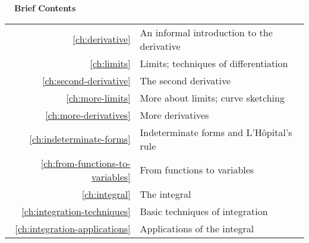 \documentclass{fund}
\begin{document}


\cleardoublepage





\pagebreak\vspace{100mm}

\hbox{}\noindent\huge\bfseries\sffamily{}\hspace{-2mm}\ \ Brief Contents\\
\hspace{-20mm}\noindent\mynormaltype\Large\sffamily{}\begin{tabular}{rl}
\ref{ch:derivative} & An informal introduction to the derivative \quad \pageref{ch:derivative}\\
\ref{ch:limits} &  Limits; techniques of differentiation \quad \pageref{ch:limits}\\
\ref{ch:second-derivative} & The second derivative \quad \pageref{ch:second-derivative}\\
\ref{ch:more-limits} & More about limits; curve sketching\quad \pageref{ch:more-limits}\\
\ref{ch:more-derivatives} & More derivatives\quad \pageref{ch:more-derivatives}\\
\ref{ch:indeterminate-forms} & Indeterminate forms and L'H\^{o}pital's rule 
                  \quad \pageref{ch:indeterminate-forms} \\
\ref{ch:from-functions-to-variables} & From functions to variables
                  \quad \pageref{ch:from-functions-to-variables} \\
\ref{ch:integral} & The integral
                  \quad \pageref{ch:integral} \\
\ref{ch:integration-techniques} & 
                  Basic techniques of integration
                  \quad \pageref{ch:integration-techniques} \\
\ref{ch:integration-applications} & 
                  Applications of the integral
                  \quad \pageref{ch:integration-applications} \\
\end{tabular}
\mynormaltype

\vspace{100mm}\pagebreak

\cleardoublepage

\mynormaltype
\end{document}
